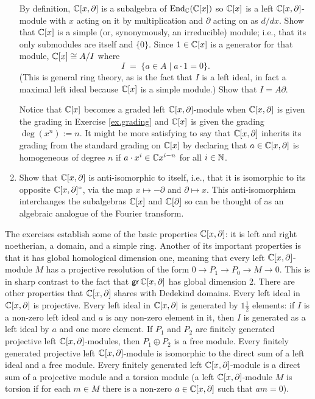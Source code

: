 \documentclass[12pt]{article}
\begin{document}
\begin{enumerate}
By definition, $\mathbb{C}[x,\partial]$ is a subalgebra of $\operatorname{End}_{\mathbb{C}}(\mathbb{C}[x])$ so $\mathbb{C}[x]$ is a left $\mathbb{C}[x,\partial]$-module
with $x$ acting on it by multiplication and $\partial$ acting on as $d/dx$. Show that $\mathbb{C}[x]$ is a simple (or, synonymously, an
irreducible) module; i.e., that its only submodules are itself and $\{0\}$. Since $1 \in \mathbb{C}[x]$ is a generator for that module, 
$\mathbb{C}[x] \cong A/I$ where
$$
I \;=\; \{a \in A \; | \; a \cdot 1=0\}.
$$
(This is general ring theory, as is the fact that $I$ is a left ideal, in fact a maximal left ideal because $\mathbb{C}[x]$ is a simple module.)
Show that $I=A\partial$. 

Notice that $\mathbb{C}[x]$ becomes a graded left $\mathbb{C}[x,\partial]$-module when $\mathbb{C}[x,\partial]$ is given the grading in 
Exercise \ref{ex.grading} and $\mathbb{C}[x]$ is given the grading $\deg(x^n):=n$. It might be more satisfying to say that 
$\mathbb{C}[x,\partial]$ inherits its grading from the standard grading on $\mathbb{C}[x]$ by declaring that $a \in \mathbb{C}[x,\partial]$ is
homogeneous of degree $n$ if $a\cdot x^i \in \mathbb{C} x^{i-n}$ for all $i \in \mathbb{N}$. 

\item
Show that $\mathbb{C}[x,\partial]$ is anti-isomorphic to itself, i.e., that it is isomorphic to its opposite $\mathbb{C}[x,\partial]^{\circ}$, via the map
$x \mapsto -\partial$ and $\partial \mapsto x$. This anti-isomorphism interchanges the subalgebras $\mathbb{C}[x]$
and $\mathbb{C}[\partial]$ so can be thought of as an algebraic analogue of the Fourier transform.
\end{enumerate}

\bigskip


The exercises establish some of the basic properties $\mathbb{C}[x,\partial]$: it is left and right noetherian, a domain, and a simple ring.
Another  of its important properties is that it has global homological dimension one, meaning that every left
$\mathbb{C}[x,\partial]$-module $M$ has a projective resolution of the form $0 \to P_1 \to P_0 \to M \to 0$. 
This is in sharp contrast to the fact that ${\sf gr}\, \mathbb{C}[x,\partial]$ has global dimension 2. There are other properties 
that $\mathbb{C}[x,\partial]$ shares with Dedekind domains. 
Every left ideal in $\mathbb{C}[x,\partial]$ is projective. Every left ideal in $\mathbb{C}[x,\partial]$ is 
generated by $1\frac{1}{2}$ elements: if $I$ is a non-zero left ideal and $a$ is any non-zero element in it, 
then $I$ is generated as a left ideal by 
$a$ and one more element. If $P_1$ and $P_2$ are finitely generated projective left $\mathbb{C}[x,\partial]$-modules, then 
$P_1 \oplus P_2$ is a free module. Every  finitely generated projective left $\mathbb{C}[x,\partial]$-module is isomorphic to the direct
sum of a left ideal and a free module. Every finitely generated left $\mathbb{C}[x,\partial]$-module is a direct sum of a projective
module and a torsion module (a left $\mathbb{C}[x,\partial]$-module $M$ is {\sf torsion} if for each $m \in M$ there is a non-zero 
$a \in  \mathbb{C}[x,\partial]$ such that $am=0$).
\end{document}
